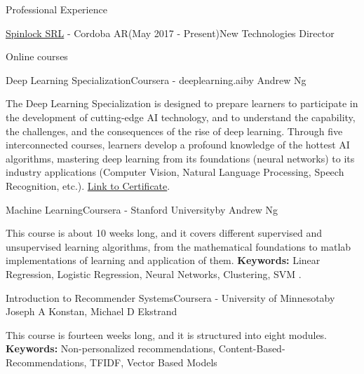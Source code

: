 \documentclass{resume}
\begin{document}
\begin{rSection}{Professional Experience}
\begin{rSubsection}{\href{https://spinlock.com.ar}{Spinlock SRL} - Cordoba AR}{(May 2017 - Present)}{New Technologies Director}{}
\begin{rSection}{Online courses}
    \begin{rSubsection}{Deep Learning Specialization}{Coursera - deeplearning.ai}{by Andrew Ng}{}
    \item The Deep Learning Specialization is designed to prepare learners
to participate in the development of cutting-edge AI technology,
and to understand the capability, the challenges, and the
consequences of the rise of deep learning. Through five
interconnected courses, learners develop a profound knowledge
of the hottest AI algorithms, mastering deep learning from its
foundations (neural networks) to its industry applications
(Computer Vision, Natural Language Processing, Speech
Recognition, etc.). \href{https://coursera.org/share/53f73312283133f99ebcca704ef2009a}{Link to Certificate}.
    \end{rSubsection}

    \begin{rSubsection}{Machine Learning}{Coursera - Stanford University}{by Andrew Ng}{}
    \item This course is about 10 weeks long, and it covers different supervised and unsupervised learning algorithms, from the mathematical foundations to matlab implementations of learning and application of them. {\bf Keywords:} Linear Regression, Logistic Regression, Neural Networks, Clustering, SVM .
    \end{rSubsection}

    \begin{rSubsection}{Introduction to Recommender Systems}{Coursera - University of Minnesota}{by Joseph A Konstan, Michael D Ekstrand}{}
    \item This course is fourteen weeks long, and it is structured into eight modules. {\bf Keywords:} Non-personalized recommendations, Content-Based-Recommendations, TFIDF, Vector Based Models 
    \end{rSubsection}




\end{rSection}
\end{rSubsection}
\end{rSection}
\end{document}
